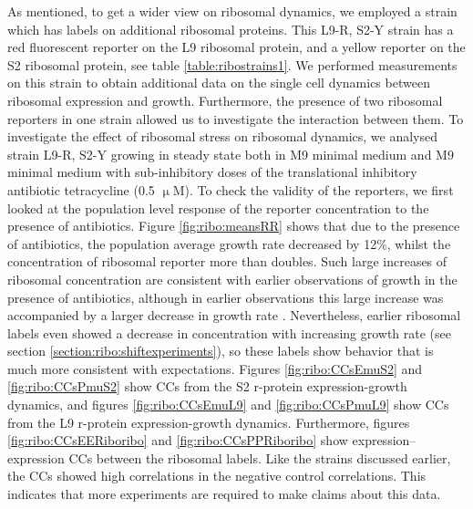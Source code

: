 As mentioned, to get a wider view on ribosomal dynamics, we employed a strain which has labels on additional ribosomal proteins. 
%
This L9-R, S2-Y strain has a red fluorescent reporter on the L9 ribosomal protein, and a yellow reporter on the S2 ribosomal protein, see table \ref{table:ribostrains1}.
%
We performed measurements on this strain 
to obtain additional data 
on the single cell dynamics between ribosomal expression and growth.
%
Furthermore, the presence of two ribosomal reporters in one strain allowed us to investigate the interaction between them.
%
To investigate the effect of ribosomal stress on ribosomal dynamics, 
we analysed strain L9-R, S2-Y 
growing in steady state both in M9 minimal medium and M9 minimal medium with sub-inhibitory doses of the translational inhibitory antibiotic tetracycline (0.5 $\upmu$M).
%
To check the validity of the reporters, 
we first looked at the population level response of the reporter concentration to the presence of antibiotics.
Figure \ref{fig:ribo:meansRR} shows that due to the presence of antibiotics, the population average growth rate decreased by 12\%, whilst the concentration of ribosomal reporter more than doubles.
%
Such large increases of ribosomal concentration are consistent with earlier observations of growth in the presence of antibiotics, although in earlier observations this large increase was accompanied by a larger decrease in growth rate \cite{Hui2015}.
%
Nevertheless, earlier ribosomal labels even showed a decrease in concentration with increasing growth rate (see section \ref{section:ribo:shiftexperiments}), 
so these labels show behavior that is much more consistent with expectations.
%
Figures \ref{fig:ribo:CCsEmuS2} and \ref{fig:ribo:CCsPmuS2} show CCs from the S2 r-protein expression-growth dynamics, and 
figures \ref{fig:ribo:CCsEmuL9} and \ref{fig:ribo:CCsPmuL9} show CCs from the L9 r-protein expression-growth dynamics.
Furthermore, figures \ref{fig:ribo:CCsEERiboribo} and \ref{fig:ribo:CCsPPRiboribo} show expression--expression CCs between the ribosomal labels.
%
Like the strains discussed earlier, the CCs showed high correlations in the negative control correlations.
This indicates that more experiments are required to make claims about this data.




